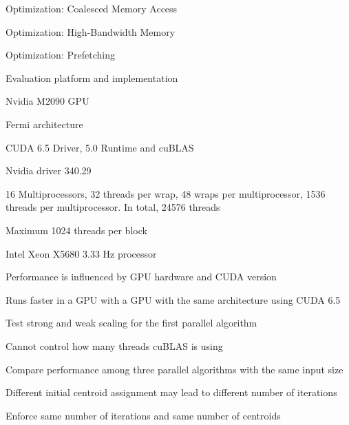 \documentclass[
nopagebreaks,
style=klope,
fleqn]{powerdot}
\begin{document}
\begin{slide}{Optimization: Coalesced Memory Access}
\end{slide}

\begin{slide}{Optimization: High-Bandwidth Memory}
\end{slide}

\begin{slide}{Optimization: Prefetching}
\end{slide}

\begin{slide}{Evaluation platform and implementation}
  \small
  \begin{compactitem}
  \item{Nvidia M2090 GPU
    \begin{compactitem}
    \item{Fermi architecture}
    \item{CUDA 6.5 Driver, 5.0 Runtime and cuBLAS}
    \item{Nvidia driver 340.29}
    \item{16 Multiprocessors, 32 threads per wrap, 48 wraps per multiprocessor, 1536 threads per
      multiprocessor. In total, 24576 threads}
    \item{Maximum 1024 threads per block}
    \end{compactitem}
  }
  \item{Intel Xeon X5680 3.33 Hz processor}
  \item{Performance is influenced by GPU hardware and CUDA version
    \begin{compactitem}
    \item{Runs faster in a GPU with a GPU with the same architecture using CUDA 6.5}  
    \end{compactitem}
  }
  \item{Test strong and weak scaling for the first parallel algorithm}
  \item{Cannot control how many threads cuBLAS is using
    \begin{compactitem}
    \item{Compare performance among three parallel algorithms with the same input size}
    \end{compactitem}
  }
  \item{Different initial centroid assignment may lead to different number of iterations
    \begin{compactitem}
    \item{Enforce same number of iterations and same number of centroids}
    \end{compactitem}
  }
  \end{compactitem}
\end{slide}
\end{document}
